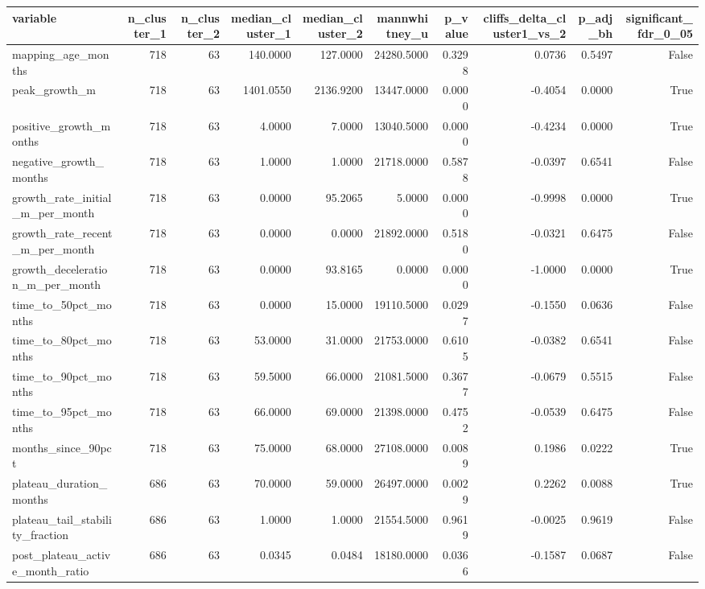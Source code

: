 \begin{tabular}{lrrrrrrrrr}
\toprule
variable & n_cluster_1 & n_cluster_2 & median_cluster_1 & median_cluster_2 & mannwhitney_u & p_value & cliffs_delta_cluster1_vs_2 & p_adj_bh & significant_fdr_0_05 \\
\midrule
mapping_age_months & 718 & 63 & 140.0000 & 127.0000 & 24280.5000 & 0.3298 & 0.0736 & 0.5497 & False \\
peak_growth_m & 718 & 63 & 1401.0550 & 2136.9200 & 13447.0000 & 0.0000 & -0.4054 & 0.0000 & True \\
positive_growth_months & 718 & 63 & 4.0000 & 7.0000 & 13040.5000 & 0.0000 & -0.4234 & 0.0000 & True \\
negative_growth_months & 718 & 63 & 1.0000 & 1.0000 & 21718.0000 & 0.5878 & -0.0397 & 0.6541 & False \\
growth_rate_initial_m_per_month & 718 & 63 & 0.0000 & 95.2065 & 5.0000 & 0.0000 & -0.9998 & 0.0000 & True \\
growth_rate_recent_m_per_month & 718 & 63 & 0.0000 & 0.0000 & 21892.0000 & 0.5180 & -0.0321 & 0.6475 & False \\
growth_deceleration_m_per_month & 718 & 63 & 0.0000 & 93.8165 & 0.0000 & 0.0000 & -1.0000 & 0.0000 & True \\
time_to_50pct_months & 718 & 63 & 0.0000 & 15.0000 & 19110.5000 & 0.0297 & -0.1550 & 0.0636 & False \\
time_to_80pct_months & 718 & 63 & 53.0000 & 31.0000 & 21753.0000 & 0.6105 & -0.0382 & 0.6541 & False \\
time_to_90pct_months & 718 & 63 & 59.5000 & 66.0000 & 21081.5000 & 0.3677 & -0.0679 & 0.5515 & False \\
time_to_95pct_months & 718 & 63 & 66.0000 & 69.0000 & 21398.0000 & 0.4752 & -0.0539 & 0.6475 & False \\
months_since_90pct & 718 & 63 & 75.0000 & 68.0000 & 27108.0000 & 0.0089 & 0.1986 & 0.0222 & True \\
plateau_duration_months & 686 & 63 & 70.0000 & 59.0000 & 26497.0000 & 0.0029 & 0.2262 & 0.0088 & True \\
plateau_tail_stability_fraction & 686 & 63 & 1.0000 & 1.0000 & 21554.5000 & 0.9619 & -0.0025 & 0.9619 & False \\
post_plateau_active_month_ratio & 686 & 63 & 0.0345 & 0.0484 & 18180.0000 & 0.0366 & -0.1587 & 0.0687 & False \\
\bottomrule
\end{tabular}
